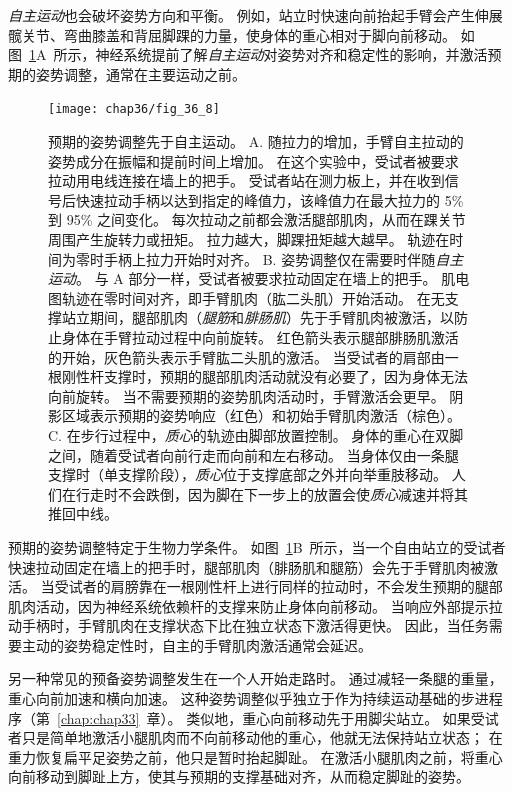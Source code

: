 \textit{自主运动}也会破坏姿势方向和平衡。
例如，站立时快速向前抬起手臂会产生伸展髋关节、弯曲膝盖和背屈脚踝的力量，使身体的重心相对于脚向前移动。
如图~\ref{fig:36_8}A~所示，神经系统提前了解\textit{自主运动}对姿势对齐和稳定性的影响，并激活预期的姿势调整，通常在主要运动之前。


\begin{figure}[htbp]
	\centering
	\texttt{[image: chap36/fig\_36\_8]}
	\caption{预期的姿势调整先于自主运动。
		A. 随拉力的增加，手臂自主拉动的姿势成分在振幅和提前时间上增加。
		在这个实验中，受试者被要求拉动用电线连接在墙上的把手。
		受试者站在测力板上，并在收到信号后快速拉动手柄以达到指定的峰值力，该峰值力在最大拉力的 5\% 到 95\% 之间变化。
		每次拉动之前都会激活腿部肌肉，从而在踝关节周围产生旋转力或扭矩。
		拉力越大，脚踝扭矩越大越早。
		轨迹在时间为零时手柄上拉力开始时对齐\cite{lee1990organization}。
		B. 姿势调整仅在需要时伴随\textit{自主运动}。
		与 A 部分一样，受试者被要求拉动固定在墙上的把手。
		肌电图轨迹在零时间对齐，即手臂肌肉（肱二头肌）开始活动。
		在无支撑站立期间，腿部肌肉（\textit{腿筋}和\textit{腓肠肌}）先于手臂肌肉被激活，以防止身体在手臂拉动过程中向前旋转。
		红色箭头表示腿部腓肠肌激活的开始，灰色箭头表示手臂肱二头肌的激活。
		当受试者的肩部由一根刚性杆支撑时，预期的腿部肌肉活动就没有必要了，因为身体无法向前旋转。
		当不需要预期的姿势肌肉活动时，手臂激活会更早。
		阴影区域表示预期的姿势响应（红色）和初始手臂肌肉激活（棕色）\cite{cordo1982properties}。
		C. 在步行过程中，\textit{质心}的轨迹由脚部放置控制。
		身体的重心在双脚之间，随着受试者向前行走而向前和左右移动。
		当身体仅由一条腿支撑时（单支撑阶段），\textit{质心}位于支撑底部之外并向举重肢移动。
		人们在行走时不会跌倒，因为脚在下一步上的放置会使\textit{质心}减速并将其推回中线\cite{mackinnon1993control}。}
	\label{fig:36_8}
\end{figure}


预期的姿势调整特定于生物力学条件。
如图~\ref{fig:36_8}B~所示，当一个自由站立的受试者快速拉动固定在墙上的把手时，腿部肌肉（腓肠肌和腿筋）会先于手臂肌肉被激活。
当受试者的肩膀靠在一根刚性杆上进行同样的拉动时，不会发生预期的腿部肌肉活动，因为神经系统依赖杆的支撑来防止身体向前移动。
当响应外部提示拉动手柄时，手臂肌肉在支撑状态下比在独立状态下激活得更快。
因此，当任务需要主动的姿势稳定性时，自主的手臂肌肉激活通常会延迟。


另一种常见的预备姿势调整发生在一个人开始走路时。
通过减轻一条腿的重量，重心向前加速和横向加速。
这种姿势调整似乎独立于作为持续运动基础的步进程序（第~\ref{chap:chap33}~章）。
类似地，重心向前移动先于用脚尖站立。
如果受试者只是简单地激活小腿肌肉而不向前移动他的重心，他就无法保持站立状态；
在重力恢复扁平足姿势之前，他只是暂时抬起脚趾。
在激活小腿肌肉之前，将重心向前移动到脚趾上方，使其与预期的支撑基础对齐，从而稳定脚趾的姿势。


